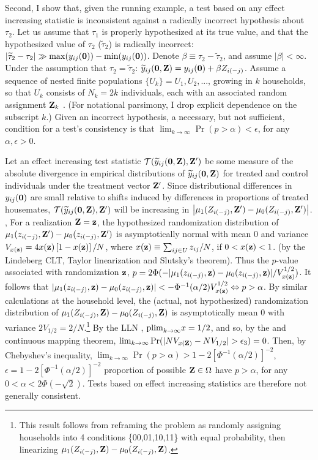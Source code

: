 Second, I show that, given the running example, a test based on any effect
increasing statistic is inconsistent against a radically incorrect hypothesis
about $\tau_2$. Let us assume that $\tau_1$ is properly hypothesized at its
true value, and that the hypothesized value of $\tau_2$ ($\widetilde \tau_2$)
is radically incorrect: $\vert \widetilde\tau_2 - \tau_2 \vert \gg
\max(y_{ij}(\mathbf{0})) - \min(y_{ij}(\mathbf{0}))$. Denote $\beta \equiv \tau_2 -
\widetilde\tau_2$, and assume $\vert \beta \vert < \infty$.  Under the
assumption that $\tau_2 = \widetilde \tau_2$: $\widetilde y_{ij}(\mathbf{0},\mathbf{Z}) =
y_{ij}(\mathbf{0}) + \beta Z_{i(-j)}$.  Assume a sequence of nested finite populations
$\{U_k\} = U_1, U_2,...$, growing in $k$ households, so that $U_k$ consists of
$N_k = 2k$ individuals, each with an associated random assignment $\mathbf{Z}_k$
\citep{isaki1982survey}. (For notational parsimony, I drop explicit dependence
on the subscript $k$.)  Given an incorrect hypothesis, a necessary, but not
sufficient, condition for a test's consistency is that $\lim_{k \rightarrow
\infty} \Pr(p > \alpha) < \epsilon$, for any $\alpha,\epsilon > 0$.

Let an effect increasing test statistic $\mathcal{T}(\widetilde y_{ij}(\mathbf{0},\mathbf{Z}),\mathbf{Z}')$ be
some measure of the absolute divergence in empirical distributions of
$\widetilde y_{ij}(\mathbf{0},\mathbf{Z})$ for treated and control individuals under the
treatment vector $\mathbf{Z}'$.  Since distributional differences in $y_{ij}(\mathbf{0})$ are
small relative to shifts induced by differences in proportions of treated
housemates,  $\mathcal{T}(\widetilde y_{ij}(\mathbf{0},\mathbf{Z}),\mathbf{Z}')$ will be increasing in $
\left\vert \mu_1(Z_{i(-j)},\mathbf{Z}') -   \mu_0(Z_{i(-j)},\mathbf{Z}') \right\vert$. , For
a realization $\mathbf{Z} = \mathbf{z}$, the hypothesized randomization distribution of
$\mu_1(z_{i(-j)},\mathbf{Z}') - \mu_0(z_{i(-j)},\mathbf{Z}')$ is asymptotically normal with
mean $0$ and variance $V_{x(\mathbf{z})} = 4 x(\mathbf{z}) \left[1-x(\mathbf{z})\right] / N$, where
$x(\mathbf{z}) \equiv \sum_{ij\in U}z _{ij} /N$, if $0 < x(\mathbf{z}) <  1$.  (by the
Lindeberg CLT, Taylor linearization and Slutsky's theorem).  Thus the
$p$-value associated with randomization $\mathbf{z}$, $p = 2
\Phi(-|\mu_1(z_{i(-j)},\mathbf{z}) - \mu_0(z_{i(-j)},\mathbf{z})|/V_{x(\mathbf{z})}^{1/2})$. It
follows that $|\mu_1(z_{i(-j)},\mathbf{z}) - \mu_0(z_{i(-j)},\mathbf{z})\vert <
-\Phi^{-1}(\alpha/2) V_{x(\mathbf{z})}^{1/2} \Leftrightarrow p > \alpha$.  By similar
calculations at the household level, the (actual, not hypothesized)
randomization distribution of $\mu_1(Z_{i(-j)},\mathbf{Z}) - \mu_0(Z_{i(-j)},\mathbf{Z})$ is
asymptotically mean $0$ with variance $2 V_{1/2} =  2/N$.\footnote{This result
  follows from reframing the problem as randomly assigning households into 4
  conditions \{00,01,10,11\} with equal probability, then linearizing
  $\mu_1(Z_{i(-j)},\mathbf{Z}) - \mu_0(Z_{i(-j)},\mathbf{Z})$.} By the LLN ,  ${\rm plim}_{k
\rightarrow \infty} x = 1/2$, and so, by the and continuous mapping theorem,
$\lim_{k \rightarrow \infty} \Pr(\vert NV_{x(\mathbf{Z})} - NV_{1/2}\vert >
\epsilon_3) = 0$.  Then, by Chebyshev's inequality, $\lim_{k \rightarrow
\infty}  \Pr(p > \alpha) > 1- 2\left[\Phi^{-1}(\alpha/2)\right]^{-2}$,
$\epsilon = 1- 2\left[\Phi^{-1}(\alpha/2)\right]^{-2}$ proportion of possible
$\mathbf{Z} \in \Omega$ have $p > \alpha$,
for any $0 < \alpha < 2\Phi(-\sqrt{2})$.  Tests based on effect increasing
statistics are therefore not generally consistent.

